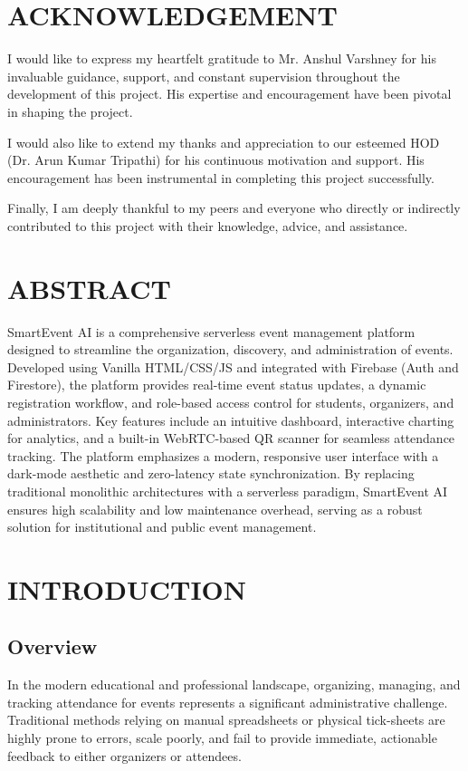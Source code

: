 \documentclass[14pt,a4paper]{extreport}
\begin{document}
\chapter*{ACKNOWLEDGEMENT}
I would like to express my heartfelt gratitude to Mr. Anshul Varshney for his invaluable guidance, support, and constant supervision throughout the development of this project. His expertise and encouragement have been pivotal in shaping the project.

I would also like to extend my thanks and appreciation to our esteemed HOD (Dr. Arun Kumar Tripathi) for his continuous motivation and support. His encouragement has been instrumental in completing this project successfully.

Finally, I am deeply thankful to my peers and everyone who directly or indirectly contributed to this project with their knowledge, advice, and assistance.


\chapter*{ABSTRACT}
SmartEvent AI is a comprehensive serverless event management platform designed to streamline the organization, discovery, and administration of events. Developed using Vanilla HTML/CSS/JS and integrated with Firebase (Auth and Firestore), the platform provides real-time event status updates, a dynamic registration workflow, and role-based access control for students, organizers, and administrators. Key features include an intuitive dashboard, interactive charting for analytics, and a built-in WebRTC-based QR scanner for seamless attendance tracking. The platform emphasizes a modern, responsive user interface with a dark-mode aesthetic and zero-latency state synchronization. By replacing traditional monolithic architectures with a serverless paradigm, SmartEvent AI ensures high scalability and low maintenance overhead, serving as a robust solution for institutional and public event management.


\clearpage
\tableofcontents
\clearpage
{}

\chapter{INTRODUCTION}
\section{Overview}
In the modern educational and professional landscape, organizing, managing, and tracking attendance for events represents a significant administrative challenge. Traditional methods relying on manual spreadsheets or physical tick-sheets are highly prone to errors, scale poorly, and fail to provide immediate, actionable feedback to either organizers or attendees.
\end{document}
